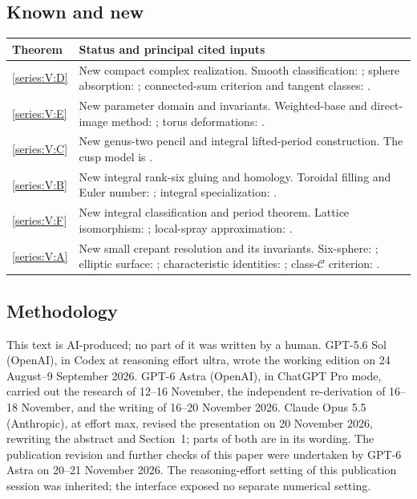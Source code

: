 \documentclass[11pt,a4paper]{article}
\numberwithin{equation}{section}
\theoremstyle{definition}
\begin{document}
\subsection{Known and new}\label{pub:V:known-new}
\begin{center}\small
\begin{tabularx}{\textwidth}{@{}lX@{}}\toprule
Theorem & Status and principal cited inputs\\\midrule
\ref{series:V:D} & New compact complex realization. Smooth classification: \cite[Definition~3.6 and Theorem~3.7(1), arXiv v3, pp.~12--14]{IVVWallForm}; sphere absorption: \cite[Theorem~A, p.~178]{IVVKramerStolz}; connected-sum criterion and tangent classes: \cite[Corollary~1.4, p.~4, Lemma~2.1, p.~5, and Theorem~2.4, p.~7]{ffMandal}.\\
\ref{series:V:E} & New parameter domain and invariants. Weighted-base and direct-image method: \cite[Lemmas~6.1--6.2, pp.~74--75, Proposition~6.10, pp.~79--80]{DGKX2026v1}; torus deformations: \cite[Theorem~2.1, p.~264]{Catanese2004}.\\
\ref{series:V:C} & New genus-two pencil and integral lifted-period construction. The cusp model is \cite[Theorem~8.7, arXiv v1, pp.~57--59]{Yang2026}.\\
\ref{series:V:B} & New integral rank-six gluing and homology. Toroidal filling and Euler number: \cite[Theorem~8.7 and Corollary~8.8, arXiv v1, pp.~57--59]{Yang2026}; integral specialization: \cite[\S7.7, pp.~60--63]{AC26}.\\
\ref{series:V:F} & New integral classification and period theorem. Lattice isomorphism: \cite[Theorem~3.4, p.~6, Algorithm~8.3, p.~21]{rootBHJ22}; local-spray approximation: \cite[Proposition~7.13 and preceding paragraph, arXiv v5, pp.~23--24]{IVVOkaOneV5}.\\
\ref{series:V:A} & New small crepant resolution and its invariants. Six-sphere: \cite[Theorems~7.17 and~7.22, pp.~57 and~60]{AC26}; elliptic surface: \cite[\S2, arXiv v1, p.~3]{E26}; characteristic identities: \cite[(1.2)--(1.4), pp.~3--4]{ffEsoleKang}; class-$\mathcal C$ criterion: \cite[Theorem~1.1, Remark~1.2, p.~2]{ffJiaMeng}.\\
\bottomrule\end{tabularx}\end{center}
\subsection{Methodology}
This text is AI-produced; no part of it was written by a human.
GPT-5.6 Sol (OpenAI), in Codex at reasoning effort ultra, wrote the
working edition on 24 August--9 September 2026. GPT-6 Astra (OpenAI),
in ChatGPT Pro mode, carried out the research of 12--16 November,
the independent re-derivation of 16--18 November, and the writing of
16--20 November 2026. Claude Opus 5.5 (Anthropic), at effort max,
revised the presentation on 20 November 2026, rewriting the abstract and
Section~1; parts of both are in its wording. The publication revision
and further checks of this paper were undertaken by GPT-6 Astra on
20--21 November 2026.
The reasoning-effort setting of this publication session was inherited;
the interface exposed no separate numerical setting.
\end{document}
